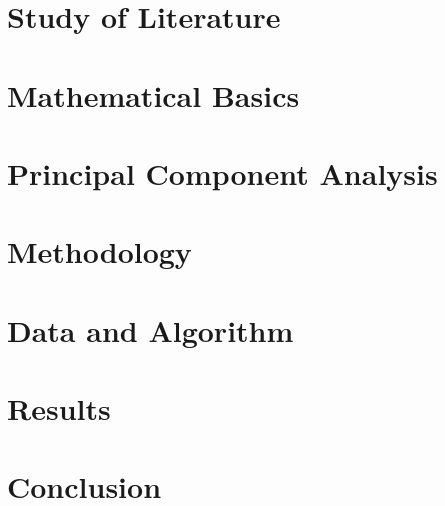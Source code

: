 \documentclass[a4paper,11pt,bibliography=totoc,listof=totoc,headinclude=true,cleardoublepage=empty,oneside]{scrbook}
\begin{document}
\chapter{Study of Literature}
\label{chapter:study_of_literature}


\chapter{Mathematical Basics}
\label{chapter:mathematical_basics}


\chapter{Principal Component Analysis}
\label{chapter:principal_component_analysis}


\chapter{Methodology}
\label{chapter:methodology}


\chapter{Data and Algorithm}
\label{chapter:data_and_algorithm}


\chapter{Results}
\label{chapter:results}

\chapter{Conclusion}
\label{chapter:conclusion}



 
%

\end{document}
